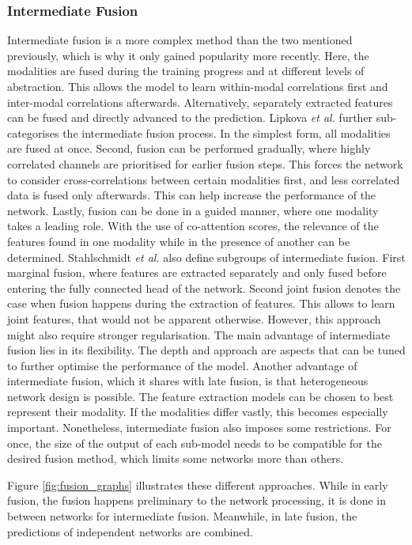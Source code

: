 \subsubsection{Intermediate Fusion}
Intermediate fusion is a more complex method than the two mentioned previously, which is why it only gained popularity more recently. Here, the modalities are fused during the training progress and at different levels of abstraction. This allows the model to learn within-modal correlations first and inter-modal correlations afterwards. Alternatively, separately extracted features can be fused and directly advanced to the prediction.
Lipkova \textit{et al.} further sub-categorises the intermediate fusion process. In the simplest form, all modalities are fused at once. Second, fusion can be performed gradually, where highly correlated channels are prioritised for earlier fusion steps. This forces the network to consider cross-correlations between certain modalities first, and less correlated data is fused only afterwards. This can help increase the performance of the network. Lastly, fusion can be done in a guided manner, where one modality takes a leading role. With the use of co-attention scores, the relevance of the features found in one modality while in the presence of another can be determined. \cite{Lipkova2022Artificial} 
Stahlschmidt \textit{et al.} also define subgroups of intermediate fusion.
First marginal fusion, where features are extracted separately and only fused before entering the fully connected head of the network. Second joint fusion denotes the case when fusion happens during the extraction of features. This allows to learn joint features, that would not be apparent otherwise. However, this approach might also require stronger regularisation. \cite{Stahlschmidt2022Multimodal}
The main advantage of intermediate fusion lies in its flexibility. The depth and approach are aspects that can be tuned to further optimise the performance of the model. Another advantage of intermediate fusion, which it shares with late fusion, is that heterogeneous network design is possible. The feature extraction models can be chosen to best represent their modality. If the modalities differ vastly, this becomes especially important. Nonetheless, intermediate fusion also imposes some restrictions. For once, the size of the output of each sub-model needs to be compatible for the desired fusion method, which limits some networks more than others. \cite{Stahlschmidt2022Multimodal}

Figure \ref{fig:fusion_graphs} illustrates these different approaches. While in early fusion, the fusion happens preliminary to the network processing, it is done in between networks for intermediate fusion. Meanwhile, in late fusion, the predictions of independent networks are combined.

